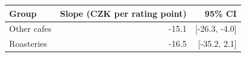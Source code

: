 \begin{tabular}{lrr}
\toprule
Group & Slope (CZK per rating point) & 95\% CI \\
\midrule
Other cafes & -15.1 & [-26.3, -4.0] \\
Roasteries & -16.5 & [-35.2, 2.1] \\
\bottomrule
\end{tabular}
